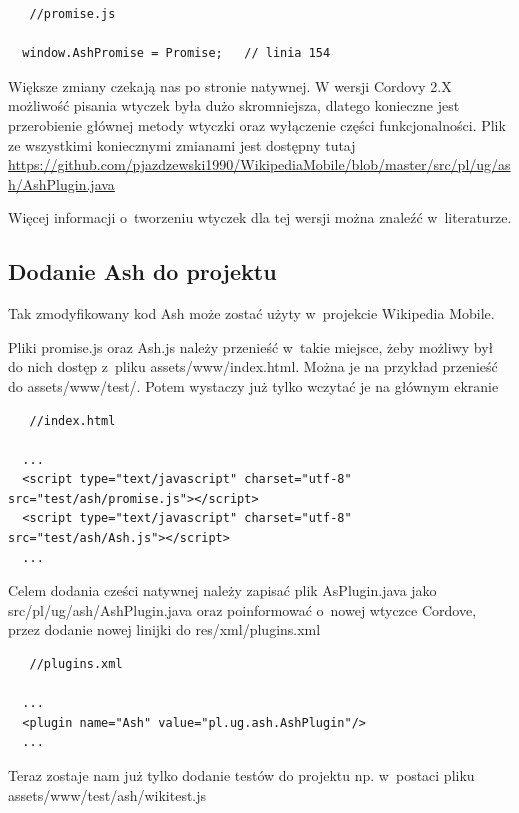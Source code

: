 \documentclass[brudnopis]{xmgr}
\begin{document}
\begin{lstlisting}
   //promise.js
  
  window.AshPromise = Promise;   // linia 154

\end{lstlisting}

Większe zmiany czekają nas po stronie natywnej. W wersji Cordovy 2.X możliwość pisania wtyczek była dużo skromniejsza, dlatego konieczne jest przerobienie głównej metody wtyczki oraz wyłączenie części funkcjonalności. Plik ze wszystkimi koniecznymi zmianami jest dostępny tutaj \url{https://github.com/pjazdzewski1990/WikipediaMobile/blob/master/src/pl/ug/ash/AshPlugin.java}

Więcej informacji o~tworzeniu wtyczek dla tej wersji można znaleźć w~literaturze\cite{Ghatol-Patel}.

\subsection{Dodanie Ash do projektu}

Tak zmodyfikowany kod Ash może zostać użyty w~projekcie Wikipedia Mobile.

Pliki promise.js oraz Ash.js należy przenieść w~takie miejsce, żeby możliwy był do nich dostęp z~pliku assets/www/index.html. Można je na przykład przenieść do assets/www/test/. Potem wystaczy już tylko wczytać je na głównym ekranie 

\begin{lstlisting}
   //index.html
  
  ...
  <script type="text/javascript" charset="utf-8" src="test/ash/promise.js"></script>
  <script type="text/javascript" charset="utf-8" src="test/ash/Ash.js"></script>
  ...

\end{lstlisting}

Celem dodania cześci natywnej należy zapisać plik AsPlugin.java jako src/pl/ug/ash/AshPlugin.java oraz poinformować o~nowej wtyczce Cordove, przez dodanie nowej linijki do res/xml/plugins.xml

\begin{lstlisting}
   //plugins.xml
  
  ...
  <plugin name="Ash" value="pl.ug.ash.AshPlugin"/>
  ...

\end{lstlisting}

Teraz zostaje nam już tylko dodanie testów do projektu np. w~postaci pliku  assets/www/test/ash/wikitest.js 
\end{document}
